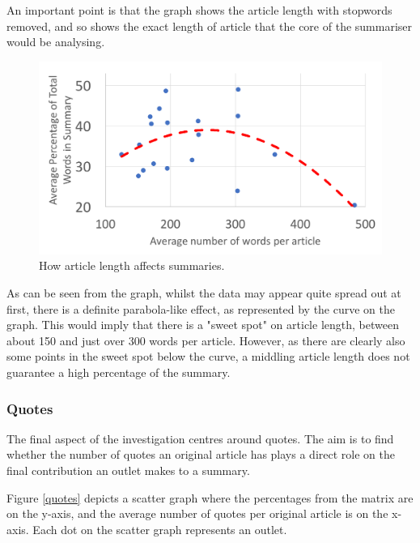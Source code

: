 \documentclass[12pt]{article}
\begin{document}
An important point is that the graph shows the article length with stopwords removed, and so shows the exact length of article that the core of the summariser would be analysing.

\begin{figure}[ht!]
  \centering
    \includegraphics[scale=0.6]{articlelength.png}
   \caption[A graph depicting responses to the User Interface Survey]{How article length affects summaries.}
   \label{articlelength}
\end{figure}

As can be seen from the graph, whilst the data may appear quite spread out at first, there is a definite parabola-like effect, as represented by the curve on the graph. This would imply that there is a "sweet spot" on article length, between about 150 and just over 300 words per article. However, as there are clearly also some points in the sweet spot below the curve, a middling article length does not guarantee a high percentage of the summary.

\subsubsection{Quotes}

The final aspect of the investigation centres around quotes. The aim is to find whether the number of quotes an original article has plays a direct role on the final contribution an outlet makes to a summary.

Figure \ref{quotes} depicts a scatter graph where the percentages from the matrix are on the y-axis, and the average number of quotes per original article is on the x-axis. Each dot on the scatter graph represents an outlet.
\end{document}
